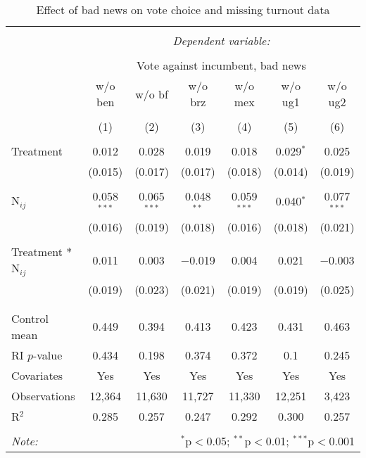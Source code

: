 \documentclass[]{article}
\begin{document}
\begin{table}[h!] \centering 
  \caption{Effect of bad news on vote choice and missing turnout data} 
  \label{main_results_explain_m3bad} 
\begin{tabular}{@{\extracolsep{1pt}}lcccccc} 
\\[-1.8ex]\hline 
\hline \\[-1.8ex] 
 & \multicolumn{6}{c}{\textit{Dependent variable:}} \\ 
\cline{2-7} 
\\[-1.8ex] & \multicolumn{6}{c}{Vote against incumbent, bad news} \\ 
 & w/o ben & w/o bf & w/o brz & w/o mex & w/o ug1 & w/o ug2 \\ 
\\[-1.8ex] & (1) & (2) & (3) & (4) & (5) & (6)\\ 
\hline \\[-1.8ex] 
 Treatment & 0.012 & 0.028 & 0.019 & 0.018 & 0.029$^{*}$ & 0.025 \\ 
  & (0.015) & (0.017) & (0.017) & (0.018) & (0.014) & (0.019) \\ 
  & & & & & & \\ 
 N$_{ij}$ & 0.058$^{***}$ & 0.065$^{***}$ & 0.048$^{**}$ & 0.059$^{***}$ & 0.040$^{*}$ & 0.077$^{***}$ \\ 
  & (0.016) & (0.019) & (0.018) & (0.016) & (0.018) & (0.021) \\ 
  & & & & & & \\ 
 Treatment * N$_{ij}$ & 0.011 & 0.003 & $-$0.019 & 0.004 & 0.021 & $-$0.003 \\ 
  & (0.019) & (0.023) & (0.021) & (0.019) & (0.019) & (0.025) \\ 
  & & & & & & \\ 
\hline \\[-1.8ex] 
Control mean & 0.449 & 0.394 & 0.413 & 0.423 & 0.431 & 0.463 \\ 
RI $p$-value & 0.434 & 0.198 & 0.374 & 0.372 & 0.1 & 0.245 \\ 
Covariates & Yes & Yes & Yes & Yes & Yes & Yes \\ 
Observations & 12,364 & 11,630 & 11,727 & 11,330 & 12,251 & 3,423 \\ 
R$^{2}$ & 0.285 & 0.257 & 0.247 & 0.292 & 0.300 & 0.257 \\ 
\hline 
\hline \\[-1.8ex] 
\textit{Note:}  & \multicolumn{6}{r}{$^{*}$p$<$0.05; $^{**}$p$<$0.01; $^{***}$p$<$0.001} \\ 
\end{tabular} 
\end{table}
\end{document}
